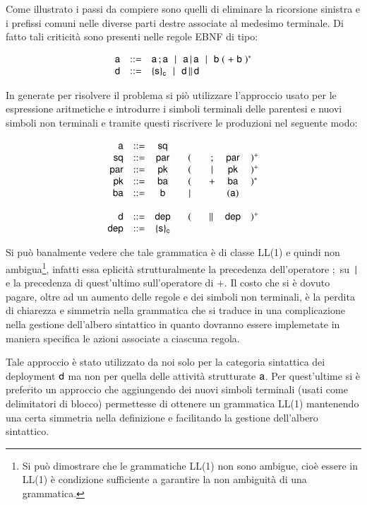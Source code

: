 Come illustrato i passi da compiere sono quelli di eliminare la ricorsione
sinistra e i prefissi comuni nelle diverse parti destre associate al medesimo
terminale. Di fatto tali criticità sono presenti nelle regole EBNF di tipo:

$$
\begin{array}{rcl}
\xs & ::= &
\xs \xsucc\xs  
\!\sepgr\! \xs \xpar \xs 
\!\sepgr\! \xb \; ( \; + \; \xb  \; )^*  \\
 
\xd & ::= &  \xeng{\xI}{\xcorr} \!\sepgr\! \xd \, \xspar \xd
\end{array}
$$ 

In generate per risolvere il problema si piò utilizzare l'approccio usato per
le espressione aritmetiche e introdurre i simboli terminali delle parentesi e
nuovi simboli non terminali e tramite questi riscrivere le produzioni nel
seguente modo:

$$
\begin{array}{rcccccl}
{\sf a} 	& ::= & {\sf sq}	& 	&&&\\
{\sf sq} 	& ::= & {\sf par} & (&  ; 	& {\sf par} & )^+ \\
{\sf par} & ::= & {\sf pk} 	& (& \,|\, & {\sf pk}  & )^+ \\
{\sf pk} 	& ::= & {\sf ba}  & (& + 	& {\sf ba}  & )^* \\
{\sf ba}  & ::= & {\sf b} 	& \!\quad | \quad\! & &( {\sf a} ) \\
\\ 
{\sf d} 	& ::= & {\sf dep} & (& \|\, & {\sf dep}  & )^+ \\
{\sf dep} & ::= & \{ {\sf s} \}_{{\sf c}} 	& & & \\
\end{array}
$$ 

Si può banalmente vedere che tale grammatica è di classe LL(1) e quindi non
ambigua\footnote{Si può dimostrare che le grammatiche LL(1) non sono ambigue,
cioè essere in LL(1) è condizione sufficiente a garantire la non ambiguità di
una grammatica.}, infatti essa eplicità strutturalmente la precedenza
dell'operatore $;$ su $\,|\,$ e la precedenza di quest'ultimo sull'operatore di
$+$. Il costo che si è dovuto pagare, oltre ad un aumento delle regole e dei
simboli non terminali, è la perdita di chiarezza e simmetria nella
grammatica che si traduce in una complicazione nella gestione
dell'albero sintattico in quanto dovranno essere implemetate in maniera
specifica le azioni associate a ciascuna regola.

Tale approccio è stato utilizzato da noi solo per la categoria sintattica dei
deployment ${\sf d}$ ma non per quella delle attività strutturate ${\sf a}$. Per
quest'ultime si è preferito un approccio che aggiungendo dei nuovi simboli
terminali (usati come delimitatori di blocco) permettesse di ottenere un
grammatica LL(1) mantenendo una certa simmetria nella definizione e facilitando
la gestione dell'albero sintattico.


